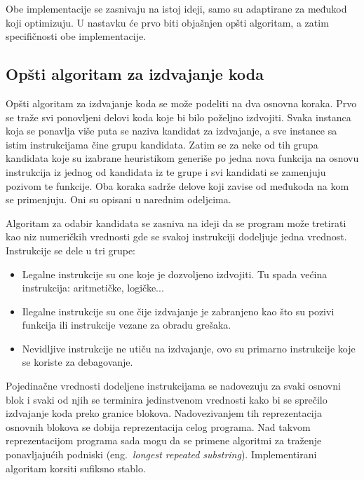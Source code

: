 \documentclass[12pt,oneside]{memoir}
\begin{document}
Obe implementacije se zasnivaju na istoj ideji, samo su adaptirane za međukod koji optimizuju.
U nastavku će prvo biti objašnjen opšti algoritam, a zatim specifičnosti obe implementacije.

\subsection{Opšti algoritam za izdvajanje koda}

Opšti algoritam za izdvajanje koda se može podeliti na dva osnovna koraka.
Prvo se traže svi ponovljeni delovi koda koje bi bilo poželjno izdvojiti.
Svaka instanca koja se ponavlja više puta se naziva kandidat za izdvajanje, a sve instance sa istim instrukcijama čine grupu kandidata.
Zatim se za neke od tih grupa kandidata koje su izabrane heuristikom generiše po jedna nova funkcija na osnovu instrukcija iz jednog od kandidata iz te grupe i svi kandidati se zamenjuju pozivom te funkcije.
Oba koraka sadrže delove koji zavise od međukoda na kom se primenjuju. Oni su opisani u narednim odeljcima.

Algoritam za odabir kandidata se zasniva na ideji da se program može tretirati kao niz numeričkih vrednosti
gde se svakoj instrukciji dodeljuje jedna vrednost.
Instrukcije se dele u tri grupe:
\begin{itemize}
  \item Legalne instrukcije su one koje je dozvoljeno izdvojiti. Tu spada većina instrukcija: aritmetičke, logičke...
  \item Ilegalne instrukcije su one čije izdvajanje je zabranjeno kao što su pozivi funkcija ili instrukcije vezane za obradu grešaka.
  \item Nevidljive instrukcije ne utiču na izdvajanje, ovo su primarno instrukcije koje se koriste za debagovanje.
\end{itemize}
Pojedinačne vrednosti dodeljene instrukcijama se nadovezuju za svaki osnovni blok i svaki od njih se terminira jedinstvenom vrednosti kako bi se sprečilo izdvajanje koda preko granice blokova.
Nadovezivanjem tih reprezentacija osnovnih blokova se dobija reprezentacija celog programa.
Nad takvom reprezentacijom programa sada mogu da se primene algoritmi za traženje ponavljajućih podniski (eng.~{\em longest repeated substring}).
Implementirani algoritam korsiti sufiksno stablo.
\end{document}
